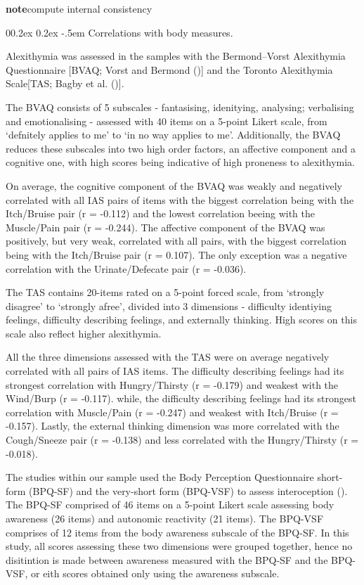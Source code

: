 \documentclass[
  man,
  floatsintext,
  longtable,
  nolmodern,
  notxfonts,
  notimes,
  colorlinks=true,linkcolor=blue,citecolor=blue,urlcolor=blue]{apa7}
\makeatletter
\renewcommand{\paragraph}{\@startsection{paragraph}{4}{\parindent}%
	{0\baselineskip \@plus 0.2ex \@minus 0.2ex}%
	{-.5em}%
	{\normalfont\normalsize\bfseries\typesectitle}}
\makeatother
\begin{document}
\textbf{note}compute internal consistency

\paragraph{Correlations with body
measures.}\label{correlations-with-body-measures}

Alexithymia was assessed in the samples with the Bermond--Vorst
Alexithymia Questionnaire {[}BVAQ; Vorst and Bermond
(){]} and the Toronto Alexithymia
Scale{[}TAS; Bagby et al. (){]}.

The BVAQ consists of 5 subscales - fantasising, idenitying, analysing;
verbalising and emotionalising - assessed with 40 items on a 5-point
Likert scale, from `defnitely applies to me' to `in no way applies to
me'. Additionally, the BVAQ reduces these subscales into two high order
factors, an affective component and a cognitive one, with high scores
being indicative of high proneness to alexithymia.

On average, the cognitive component of the BVAQ was weakly and
negatively correlated with all IAS pairs of items with the biggest
correlation being with the Itch/Bruise pair (r = -0.112) and the lowest
correlation beeing with the Muscle/Pain pair (r = -0.244). The affective
component of the BVAQ was positively, but very weak, correlated with all
pairs, with the biggest correlation being with the Itch/Bruise pair (r =
0.107). The only exception was a negative correlation with the
Urinate/Defecate pair (r = -0.036).

The TAS contains 20-items rated on a 5-point forced scale, from
`strongly disagree' to `strongly afree', divided into 3 dimensions -
difficulty identiying feelings, difficulty describing feelings, and
externally thinking. High scores on this scale also reflect higher
alexithymia.

All the three dimensions assessed with the TAS were on average
negatively correlated with all pairs of IAS items. The difficulty
describing feelings had its strongest correlation with Hungry/Thirsty (r
= -0.179) and weakest with the Wind/Burp (r = -0.117). while, the
difficulty describing feelings had its strongest correlation with
Muscle/Pain (r = -0.247) and weakest with Itch/Bruise (r = -0.157).
Lastly, the external thinking dimension was more correlated with the
Cough/Sneeze pair (r = -0.138) and less correlated with the
Hungry/Thirsty (r = -0.018).

The studies within our sample used the Body Perception Questionnaire
short-form (BPQ-SF) and the very-short form (BPQ-VSF) to assess
interoception (). The BPQ-SF comprised of 46 items on a 5-point Likert scale
assessing body awareness (26 items) and autonomic reactivity (21 items).
The BPQ-VSF comprises of 12 items from the body awareness subscale of
the BPQ-SF. In this study, all scores assessing these two dimensions
were grouped together, hence no disitintion is made between awareness
measured with the BPQ-SF and the BPQ-VSF, or eith scores obtained only
using the awareness subscale.
\end{document}
